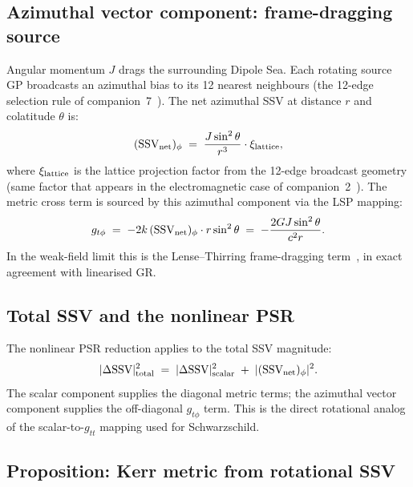 \documentclass[12pt]{article}
\newcommand{\SSV}{\text{SSV}}
\begin{document}
\subsection{Azimuthal vector component: frame-dragging source}
\label{subsec:kerr_vector}

Angular momentum $J$ drags the surrounding Dipole Sea.  Each rotating
source GP broadcasts an azimuthal bias to its 12 nearest neighbours
(the 12-edge selection rule of companion~7~\cite{c7}).  The net
azimuthal SSV at distance $r$ and colatitude $\theta$ is:
\begin{equation}
  (\SSV_{\rm net})_\phi \;=\; \frac{J\sin^2\theta}{r^3}
  \cdot \xi_{\rm lattice},
  \label{eq:kerr_vector}
\end{equation}
where $\xi_{\rm lattice}$ is the lattice projection factor from the
12-edge broadcast geometry (same factor that appears in the
electromagnetic case of companion~2~\cite{c2}).  The metric cross
term is sourced by this azimuthal component via the LSP mapping:
\begin{equation}
  g_{t\phi} \;=\; -2k\,(\SSV_{\rm net})_\phi \cdot r\sin^2\theta
  \;=\; -\frac{2GJ\sin^2\theta}{c^2 r}.
  \label{eq:gtphi}
\end{equation}
In the weak-field limit this is the Lense--Thirring frame-dragging
term~\cite{lense1918}, in exact agreement with linearised GR.

\subsection{Total SSV and the nonlinear PSR}
\label{subsec:kerr_total}

The nonlinear PSR reduction applies to the total SSV magnitude:
\begin{equation}
  |\Delta\SSV|_{\rm total}^2
  \;=\; |\Delta\SSV|_{\rm scalar}^2
  \;+\; |(\SSV_{\rm net})_\phi|^2.
  \label{eq:ssv_total}
\end{equation}
The scalar component supplies the diagonal metric terms; the azimuthal
vector component supplies the off-diagonal $g_{t\phi}$ term.  This
is the direct rotational analog of the scalar-to-$g_{tt}$ mapping
used for Schwarzschild.

\subsection{Proposition: Kerr metric from rotational SSV}
\label{subsec:kerr_prop}
\end{document}
